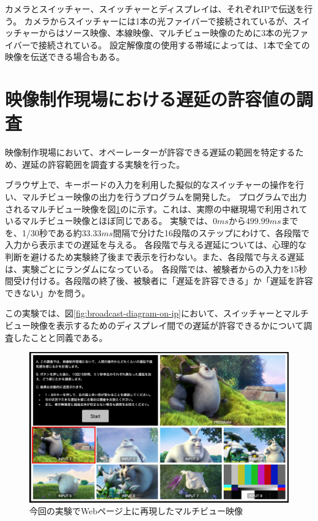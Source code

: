 カメラとスイッチャー、スイッチャーとディスプレイは、それぞれIPで伝送を行う。
カメラからスイッチャーには1本の光ファイバーで接続されているが、スイッチャーからはソース映像、本線映像、マルチビュー映像のために3本の光ファイバーで接続されている。
設定解像度の使用する帯域によっては、1本で全ての映像を伝送できる場合もある。

\section{映像制作現場における遅延の許容値の調査}

映像制作現場において、オペーレーターが許容できる遅延の範囲を特定するため、遅延の許容範囲を調査する実験を行った。

ブラウザ上で、キーボードの入力を利用した擬似的なスイッチャーの操作を行い、マルチビュー映像の出力を行うプログラムを開発した。
プログラムで出力されるマルチビュー映像を図\ref{fig:mv-delay-virtual}のに示す。これは、実際の中継現場で利用されているマルチビュー映像とほぼ同じである。
実験では、$0ms$から$499.99ms$までを、1/30秒である約$33.33ms$間隔で分けた16段階のステップにわけて、各段階で入力から表示までの遅延を与える。
各段階で与える遅延については、心理的な判断を避けるため実験終了後まで表示を行わない。また、各段階で与える遅延は、実験ごとにランダムになっている。
各段階では、被験者からの入力を15秒間受け付ける。各段階の終了後、被験者に「遅延を許容できる」か「遅延を許容できない」かを問う。

この実験では、図\ref{fig:broadcast-diagram-on-ip}において、スイッチャーとマルチビュー映像を表示するためのディスプレイ間での遅延が許容できるかについて調査したことと同義である。

\begin{figure}[htbp]
  \begin{center}
    \includegraphics[bb=0 0 1294 750,width=14cm]{img/mv-delay-virtual.png}
  \end{center}
  \caption{今回の実験でWebページ上に再現したマルチビュー映像}
  \label{fig:mv-delay-virtual}
\end{figure}

